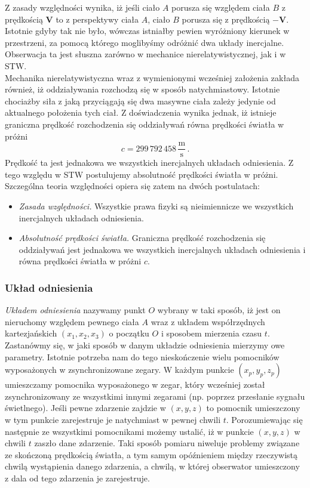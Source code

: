 \documentclass[../main.tex]{subfiles}
\begin{document}
Z zasady względności wynika, iż jeśli ciało \(A\) porusza się względem ciała \(B\) z prędkością \(\mathbf{V}\) to z perspektywy ciała \(A\), ciało \(B\) porusza się z prędkością \(-\mathbf{V}\). Istotnie gdyby tak nie było, wówczas istniałby pewien wyróżniony kierunek w przestrzeni, za pomocą którego moglibyśmy odróżnić dwa układy inercjalne. Obserwacja ta jest słuszna zarówno w mechanice nierelatywistycznej, jak i w STW.\\

Mechanika nierelatywistyczna wraz z wymienionymi wcześniej założenia zakłada również, iż oddziaływania rozchodzą się w sposób natychmiastowy. Istotnie chociażby siła z jaką przyciągają się dwa masywne ciała zależy jedynie od aktualnego położenia tych ciał. Z doświadczenia wynika jednak, iż istnieje graniczna prędkość rozchodzenia się oddziaływań równa prędkości światła w próżni
\begin{equation*}
    c=299\,792\,458\,\frac{\text{m}}{\text{s}}\,.
\end{equation*}
Prędkość ta jest jednakowa we wszystkich inercjalnych układach odniesienia. Z tego względu w STW postulujemy absolutność prędkości światła w próżni. Szczególna teoria względności opiera się zatem na dwóch postulatach:
\begin{itemize}
    \item \textit{Zasada względności.} Wszystkie prawa fizyki są nieimiennicze we wszystkich inercjalnych układach odniesienia.
    \item \textit{Absolutność prędkości światła.} Graniczna prędkość rozchodzenia się oddziaływań jest jednakowa we wszystkich inercjalnych układach odniesienia i równa prędkości światła w próżni \(c\).
\end{itemize}

\subsubsection{Układ odniesienia}
\textit{Układem odniesienia} nazywamy punkt \(O\) wybrany w taki sposób, iż jest on nieruchomy względem pewnego ciała \(A\) wraz z układem współrzędnych kartezjańskich \((x_1,x_2,x_3)\) o początku \(O\) i sposobem mierzenia czasu \(t\).\\

Zastanówmy się, w jaki sposób w danym układzie odniesienia mierzymy owe parametry. Istotnie potrzeba nam do tego nieskończenie wielu pomocników wyposażonych w zsynchronizowane zegary. W każdym punkcie \((x_p,y_p,z_p)\) umieszczamy pomocnika wyposażonego w zegar, który wcześniej został zsynchronizowany ze wszystkimi innymi zegarami (np. poprzez przesłanie sygnału świetlnego). Jeśli pewne zdarzenie zajdzie w \((x,y,z)\) to pomocnik umieszczony w tym punkcie zarejestruje je natychmiast w pewnej chwili \(t\). Porozumiewając się następnie ze wszystkimi pomocnikami możemy ustalić, iż w punkcie \((x,y,z)\) w chwili \(t\) zaszło dane zdarzenie. Taki sposób pomiaru niweluje problemy związane ze skończoną prędkością światła, a tym samym opóźnieniem między rzeczywistą chwilą wystąpienia danego zdarzenia, a chwilą, w której obserwator umieszczony z dala od tego zdarzenia je zarejestruje.\\
\end{document}
